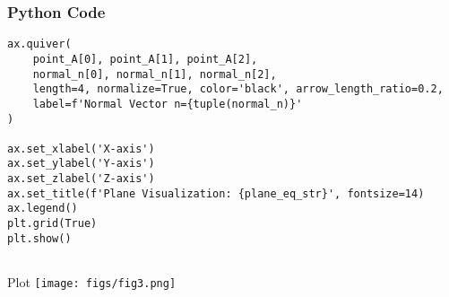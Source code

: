 \documentclass{beamer}
\begin{document}
\begin{frame}[fragile]
    \frametitle{Python Code}
    \begin{lstlisting}
ax.quiver(
    point_A[0], point_A[1], point_A[2],
    normal_n[0], normal_n[1], normal_n[2],
    length=4, normalize=True, color='black', arrow_length_ratio=0.2,
    label=f'Normal Vector n={tuple(normal_n)}'
)

ax.set_xlabel('X-axis')
ax.set_ylabel('Y-axis')
ax.set_zlabel('Z-axis')
ax.set_title(f'Plane Visualization: {plane_eq_str}', fontsize=14)
ax.legend()
plt.grid(True)
plt.show()
   
    \end{lstlisting}
\end{frame}
\begin{frame}{Plot}
    \centering
    \texttt{[image: figs/fig3.png]}     
\end{frame}
\end{document}
